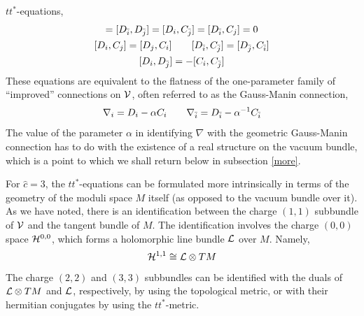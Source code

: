 $tt^*$-equations,
\begin{gather}
[D_i,D_j]=[\Db_\ib,\Db_\jb]=[D_i,\Cb_\jb] = [\Db_\ib,C_j]=0\nonumber \\
\eqlabel{ttstareq}
[D_i,C_j]=[D_j,C_i]\qquad [\Db_\ib,\Cb_\jb]=[\Db_\jb,\Cb_\ib]\\\nonumber
[D_i,\Db_\jb] = -[C_i,\Cb_\jb]
\end{gather}
These equations are equivalent to the flatness of the one-parameter family
of ``improved'' connections on ${\cal V}$, often referred to as the Gauss-Manin 
connection,
\begin{equation}
\nabla_i = D_i - \alpha C_i \qquad \nabla_{\bar i} = {D}_{\bar i} - \alpha^{-1} {C}_{\bar i}
\end{equation}
The value of the parameter $\alpha$ in identifying $\nabla$ with
the geometric Gauss-Manin connection has to do with the existence of a real
structure on the vacuum bundle, which is a point to which we shall return
below in subsection \ref{more}.

For $\hat c=3$, the $tt^*$-equations can be formulated more intrinsically
in terms of the geometry of the moduli space $M$ itself (as opposed to 
the vacuum bundle over it). As we have noted, there is an identification
between the charge $(1,1)$ subbundle of ${\cal V}$ and the tangent bundle
of $M$. The identification involves the charge $(0,0)$ space ${\cal H}^{0,0}$,
which forms a holomorphic line bundle ${\cal L}$ over $M$. Namely,
\begin{equation}
\eqlabel{ident}
\calh^{1,1} \cong \call\otimes TM
\end{equation}
The charge $(2,2)$ and $(3,3)$ subbundles can be identified with the duals
of ${\cal L}\otimes TM$ and ${\cal L}$, respectively, by using the topological metric, 
or with their hermitian conjugates by using the $tt^*$-metric.

